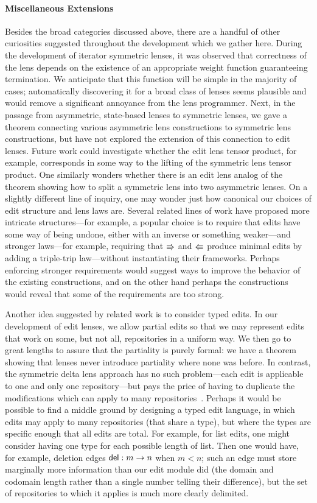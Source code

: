 \paragraph*{Miscellaneous Extensions}
Besides the broad categories discussed above, there are a handful of other
curiosities suggested throughout the development which we gather here.
During the development of iterator symmetric lenses, it was observed that
correctness of the lens depends on the existence of an appropriate weight
function guaranteeing termination. We anticipate that this function will be
simple in the majority of cases; automatically discovering it for a broad
class of lenses seems plausible and would remove a significant annoyance
from the lens programmer. Next, in the passage from asymmetric, state-based
lenses to symmetric lenses, we gave a theorem connecting various asymmetric
lens constructions to symmetric lens constructions, but have not explored
the extension of this connection to edit lenses. Future work could
investigate whether the edit lens tensor product, for example, corresponds
in some way to the lifting of the symmetric lens tensor product. One
similarly wonders whether
there is an edit lens analog of the theorem showing how to split a symmetric
lens into two asymmetric lenses. On a slightly different line of inquiry,
one may wonder just how canonical our choices of edit structure and lens
laws are. Several related lines of work have proposed more intricate
structures---for example, a popular choice is to require that edits have
some way of being undone, either with an inverse or something weaker---and
stronger laws---for example, requiring that $\mathord{\Rrightarrow}$ and $\mathord{\Lleftarrow}$ produce
minimal edits by adding a triple-trip law---without instantiating their
frameworks. Perhaps enforcing stronger requirements would suggest ways to
improve the behavior of the existing constructions, and on the other hand
perhaps the constructions would reveal that some of the requirements are too
strong.

Another idea suggested by related work is to consider typed edits. In our
development of edit lenses, we allow partial edits so that we may represent
edits that work on some, but not all, repositories in a uniform way. We then
go to great lengths to assure that the partiality is purely formal: we have
a theorem showing that lenses never introduce partiality where none was
before. In contrast, the symmetric delta lens approach has no such
problem---each edit is applicable to one and only one repository---but pays
the price of having to duplicate the modifications which can apply to many
repositories~\cite{Diskin-Delta11}. Perhaps it would be possible to find a
middle ground by designing a typed edit language, in which edits may apply
to many repositories (that share a type), but where the types are specific
enough that all edits are total. For example, for list edits, one might
consider having one type for each possible length of list. Then one would
have, for example, deletion edges $\mathsf{del} : m \to n$ when $m<n$; such
an edge must store marginally more information than our edit module did (the
domain and codomain length rather than a single number telling their
difference), but the set of repositories to which it applies is much more
clearly delimited.


